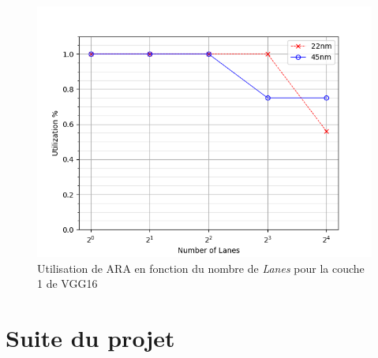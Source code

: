 \documentclass[11pt,letterpaper]{article}
\begin{document}
\begin{multicols}{2}
\begin{figure}[H]
        \label{fig:performance}
    \end{figure}
    \begin{figure}[H]
        \centering
        \includegraphics[width=\linewidth]{utilization.png}
        \caption{Utilisation de ARA en fonction du nombre de \textit{Lanes} pour la couche 1 de VGG16}
        \label{fig:utilization}
    \end{figure}


    \end{multicols}


\section*{Suite du projet}
\end{document}
